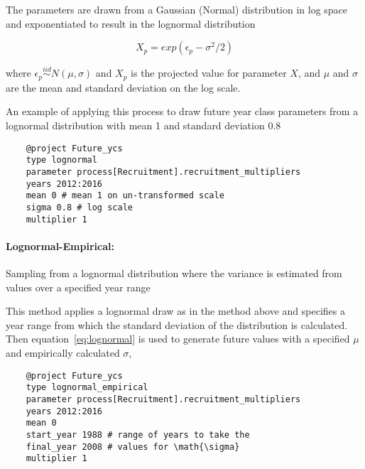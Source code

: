 The parameters are drawn from a Gaussian (Normal) distribution in log space and exponentiated to result in the lognormal distribution

\begin{equation}\label{eq:lognormal}
X_p = exp(\epsilon_p - \sigma^2 / 2)
\end{equation}

where $\epsilon_p\stackrel{iid}{\sim}N(\mu,\sigma)$ and $X_p$ is the projected value for parameter $X$, and $\mu$ and $\sigma$ are the mean and standard deviation on the log scale.

An example of applying this process to draw future year class parameters from a lognormal distribution with mean 1 and standard deviation 0.8

{\small{\begin{verbatim}
	@project Future_ycs
	type lognormal
	parameter process[Recruitment].recruitment_multipliers
	years 2012:2016
	mean 0 # mean 1 on un-transformed scale
	sigma 0.8 # log scale
	multiplier 1
\end{verbatim}}}

\paragraph[Lognormal-Empirical]{Lognormal-Empirical:} Sampling from a lognormal distribution where the variance is estimated from values over a specified year range  \label{sec:Project-LogNormalEmpirical} 

This method applies a lognormal draw as in the  method above and specifies a year range from which the standard deviation of the distribution is calculated. Then equation~\eqref{eq:lognormal} is used to generate future values with a specified $\mu$ and empirically calculated $\sigma$,

{\small{\begin{verbatim}
	@project Future_ycs
	type lognormal_empirical
	parameter process[Recruitment].recruitment_multipliers
	years 2012:2016
	mean 0
	start_year 1988 # range of years to take the
	final_year 2008 # values for \math{\sigma}
	multiplier 1
\end{verbatim}}}


